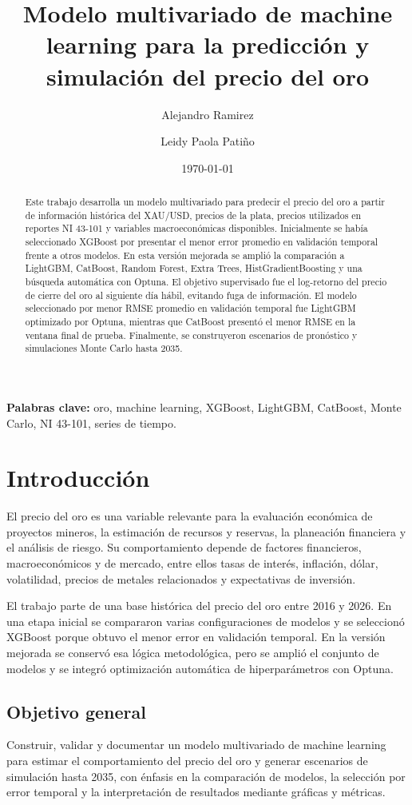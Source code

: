 \documentclass[12pt,letterpaper]{article}
\title{Modelo multivariado de machine learning para la predicción y simulación del precio del oro}
\author{Alejandro Ramirez \and Leidy Paola Patiño}
\date{\today}
\begin{document}
\maketitle

\begin{abstract}
Este trabajo desarrolla un modelo multivariado para predecir el precio del oro a partir de información histórica del XAU/USD, precios de la plata, precios utilizados en reportes NI 43-101 y variables macroeconómicas disponibles. Inicialmente se había seleccionado XGBoost por presentar el menor error promedio en validación temporal frente a otros modelos. En esta versión mejorada se amplió la comparación a LightGBM, CatBoost, Random Forest, Extra Trees, HistGradientBoosting y una búsqueda automática con Optuna. El objetivo supervisado fue el log-retorno del precio de cierre del oro al siguiente día hábil, evitando fuga de información. El modelo seleccionado por menor RMSE promedio en validación temporal fue LightGBM optimizado por Optuna, mientras que CatBoost presentó el menor RMSE en la ventana final de prueba. Finalmente, se construyeron escenarios de pronóstico y simulaciones Monte Carlo hasta 2035.
\end{abstract}

\textbf{Palabras clave:} oro, machine learning, XGBoost, LightGBM, CatBoost, Monte Carlo, NI 43-101, series de tiempo.

\section{Introducción}
El precio del oro es una variable relevante para la evaluación económica de proyectos mineros, la estimación de recursos y reservas, la planeación financiera y el análisis de riesgo. Su comportamiento depende de factores financieros, macroeconómicos y de mercado, entre ellos tasas de interés, inflación, dólar, volatilidad, precios de metales relacionados y expectativas de inversión.

El trabajo parte de una base histórica del precio del oro entre 2016 y 2026. En una etapa inicial se compararon varias configuraciones de modelos y se seleccionó XGBoost porque obtuvo el menor error en validación temporal. En la versión mejorada se conservó esa lógica metodológica, pero se amplió el conjunto de modelos y se integró optimización automática de hiperparámetros con Optuna.

\subsection{Objetivo general}
Construir, validar y documentar un modelo multivariado de machine learning para estimar el comportamiento del precio del oro y generar escenarios de simulación hasta 2035, con énfasis en la comparación de modelos, la selección por error temporal y la interpretación de resultados mediante gráficas y métricas.
\end{document}
